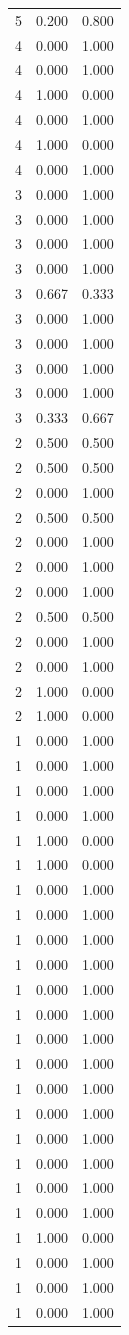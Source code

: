 \begin{tabular}{rrr}
5 & 0.200 & 0.800 \\
4 & 0.000 & 1.000 \\
4 & 0.000 & 1.000 \\
4 & 1.000 & 0.000 \\
4 & 0.000 & 1.000 \\
4 & 1.000 & 0.000 \\
4 & 0.000 & 1.000 \\
3 & 0.000 & 1.000 \\
3 & 0.000 & 1.000 \\
3 & 0.000 & 1.000 \\
3 & 0.000 & 1.000 \\
3 & 0.667 & 0.333 \\
3 & 0.000 & 1.000 \\
3 & 0.000 & 1.000 \\
3 & 0.000 & 1.000 \\
3 & 0.000 & 1.000 \\
3 & 0.333 & 0.667 \\
2 & 0.500 & 0.500 \\
2 & 0.500 & 0.500 \\
2 & 0.000 & 1.000 \\
2 & 0.500 & 0.500 \\
2 & 0.000 & 1.000 \\
2 & 0.000 & 1.000 \\
2 & 0.000 & 1.000 \\
2 & 0.500 & 0.500 \\
2 & 0.000 & 1.000 \\
2 & 0.000 & 1.000 \\
2 & 1.000 & 0.000 \\
2 & 1.000 & 0.000 \\
1 & 0.000 & 1.000 \\
1 & 0.000 & 1.000 \\
1 & 0.000 & 1.000 \\
1 & 0.000 & 1.000 \\
1 & 1.000 & 0.000 \\
1 & 1.000 & 0.000 \\
1 & 0.000 & 1.000 \\
1 & 0.000 & 1.000 \\
1 & 0.000 & 1.000 \\
1 & 0.000 & 1.000 \\
1 & 0.000 & 1.000 \\
1 & 0.000 & 1.000 \\
1 & 0.000 & 1.000 \\
1 & 0.000 & 1.000 \\
1 & 0.000 & 1.000 \\
1 & 0.000 & 1.000 \\
1 & 0.000 & 1.000 \\
1 & 0.000 & 1.000 \\
1 & 0.000 & 1.000 \\
1 & 0.000 & 1.000 \\
1 & 1.000 & 0.000 \\
1 & 0.000 & 1.000 \\
1 & 0.000 & 1.000 \\
1 & 0.000 & 1.000 \\
\bottomrule
\end{tabular}
